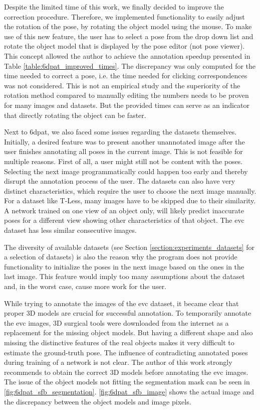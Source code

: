 Despite the limited time of this work, we finally decided to improve the correction procedure. Therefore, we implemented functionality to easily adjust the rotation of the pose, by rotating the object model using the mouse. To make use of this new feature, the user has to select a pose from the drop down list and rotate the object model that is displayed by the pose editor (not pose viewer). This concept allowed the author to achieve the annotation speedup presented in Table \ref{table:6dpat_improved_times}. The discrepancy was only computed for the time needed to correct a pose, i.e. the time needed for clicking correspondences was not considered. This is not an empirical study and the superiority of the rotation method compared to manually editing the numbers needs to be proven for many images and datasets. But the provided times can serve as an indicator that directly rotating the object can be faster.

Next to \ac{6dpat}, we also faced some issues regarding the datasets themselves. Initially, a desired feature was to present another unannotated image after the user finishes annotating all poses in the current image. This is not feasible for multiple reasons. First of all, a user might still not be content with the poses. Selecting the next image programmatically could happen too early and thereby disrupt the annotation process of the user. The datasets can also have very distinct characteristics, which require the user to choose the next image manually. For a dataset like T-Less, many images have to be skipped due to their similarity. A network trained on one view of an object only, will likely predict inaccurate poses for a different view showing other characteristics of that object. The \ac{evc} dataset has less similar consecutive images.

The diversity of available datasets (see Section \ref{section:experiments_datasets} for a selection of datasets) is also the reason why the program does not provide functionality to initialize the poses in the next image based on the ones in the last image. This feature would imply too many assumptions about the dataset and, in the worst case, cause more work for the user. 

While trying to annotate the images of the \ac{evc} dataset, it became clear that proper 3D models are crucial for successful annotation. To temporarily annotate the \ac{evc} images, 3D surgical tools were downloaded from the internet as a replacement for the missing object models. But having a different shape and also missing the distinctive features of the real objects makes it very difficult to estimate the ground-truth pose. The influence of contradicting annotated poses during training of a network is not clear. The author of this work strongly recommends to obtain the correct 3D models before annotating the \ac{evc} images. The issue of the object models not fitting the segmentation mask can be seen in \fig \ref{fig:6dpat_sfb_segmentation}. \fig \ref{fig:6dpat_sfb_image} shows the actual image and the discrepancy between the object models and image pixels.

